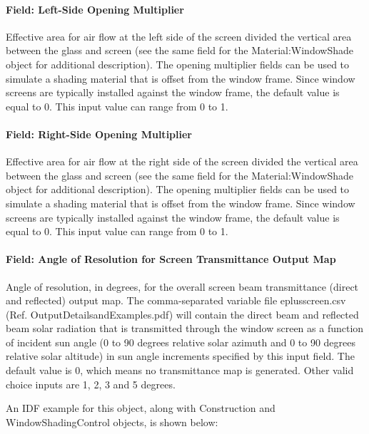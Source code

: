 \paragraph{Field: Left-Side Opening Multiplier}\label{field-left-side-opening-multiplier-2}

Effective area for air flow at the left side of the screen divided the vertical area between the glass and screen (see the same field for the Material:WindowShade object for additional description). The opening multiplier fields can be used to simulate a shading material that is offset from the window frame. Since window screens are typically installed against the window frame, the default value is equal to 0. This input value can range from 0 to 1.

\paragraph{Field: Right-Side Opening Multiplier}\label{field-right-side-opening-multiplier-2}

Effective area for air flow at the right side of the screen divided the vertical area between the glass and screen (see the same field for the Material:WindowShade object for additional description). The opening multiplier fields can be used to simulate a shading material that is offset from the window frame. Since window screens are typically installed against the window frame, the default value is equal to 0. This input value can range from 0 to 1.

\paragraph{Field: Angle of Resolution for Screen Transmittance Output Map}\label{field-angle-of-resolution-for-screen-transmittance-output-map}

Angle of resolution, in degrees, for the overall screen beam transmittance (direct and reflected) output map. The comma-separated variable file eplusscreen.csv (Ref. OutputDetailsandExamples.pdf) will contain the direct beam and reflected beam solar radiation that is transmitted through the window screen as a function of incident sun angle (0 to 90 degrees relative solar azimuth and 0 to 90 degrees relative solar altitude) in sun angle increments specified by this input field. The default value is 0, which means no transmittance map is generated. Other valid choice inputs are 1, 2, 3 and 5 degrees.

An IDF example for this object, along with Construction and WindowShadingControl objects, is shown below:

